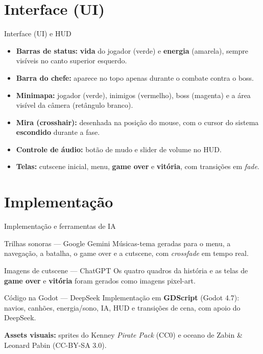 \documentclass[aspectratio=169]{beamer}
\begin{document}
\section{Interface (UI)}
\begin{frame}{Interface (UI) e HUD}
  \begin{itemize}
    \item \textbf{Barras de status:} \textbf{vida} do jogador (verde) e
      \textbf{energia} (amarela), sempre vis\'iveis no canto superior esquerdo.
    \item \textbf{Barra do chefe:} aparece no topo apenas durante o combate
      contra o boss.
    \item \textbf{Minimapa:} jogador (verde), inimigos (vermelho), boss (magenta)
      e a \'area vis\'ivel da c\^amera (ret\^angulo branco).
    \item \textbf{Mira (crosshair):} desenhada na posi\c{c}\~ao do mouse, com o
      cursor do sistema \textbf{escondido} durante a fase.
    \item \textbf{Controle de \'audio:} bot\~ao de mudo e slider de volume no HUD.
    \item \textbf{Telas:} cutscene inicial, menu, \textbf{game over} e
      \textbf{vit\'oria}, com transi\c{c}\~oes em \emph{fade}.
  \end{itemize}
\end{frame}

\section{Implementa\c{c}\~ao}
\begin{frame}{Implementa\c{c}\~ao e ferramentas de IA}
  \begin{block}{Trilhas sonoras --- Google Gemini}
    M\'usicas-tema geradas para o menu, a navega\c{c}\~ao, a batalha, o game over
    e a cutscene, com \emph{crossfade} em tempo real.
  \end{block}
  \begin{block}{Imagens de cutscene --- ChatGPT}
    Os quatro quadros da hist\'oria e as telas de \textbf{game over} e
    \textbf{vit\'oria} foram gerados como imagens pixel-art.
  \end{block}
  \begin{block}{C\'odigo na Godot --- DeepSeek}
    Implementa\c{c}\~ao em \textbf{GDScript} (Godot 4.7): navios, canh\~oes,
    energia/sono, IA, HUD e transi\c{c}\~oes de cena, com apoio do DeepSeek.
  \end{block}
  \medskip
  {\small \textbf{Assets visuais:} sprites do Kenney \emph{Pirate Pack} (CC0) e
  oceano de Zabin \& Leonard Pabin (CC-BY-SA 3.0).}
\end{frame}
\end{document}
